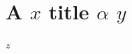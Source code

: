 \documentclass[11pt]{article}
\author{root}
\date{\today}
\title{}
\begin{document}
\tableofcontents

\section{A \(x\) title \(\alpha\) \(y\)}
\label{sec:org6093e32}
\(z\)
\end{document}
